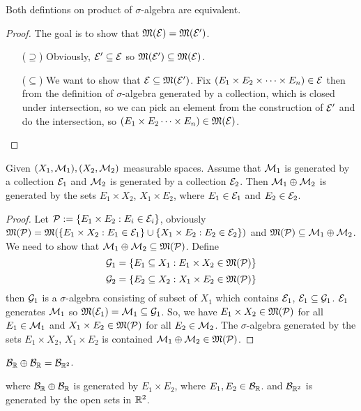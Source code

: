 \begin{claim}
  Both defintions on product of $\sigma$-algebra are equivalent. 
\end{claim}

\begin{proof}
  The goal is to show that $\mathfrak M(\mathcal E) = \mathfrak M(\mathcal E')$.
  \begin{itemize}
    \item[($\supseteq$)] Obviously, $\mathcal E' \subseteq \mathcal E$ so $\mathfrak M(\mathcal E') \subseteq \mathfrak M(\mathcal E)$.
    \item[($\subseteq$)] We want to show that $\mathcal E \subseteq \mathfrak M(\mathcal E')$. Fix $(E_1 \times E_2 \times \dotsm \times E_n) \in \mathcal E$ then 
    from the definition of $\sigma$-algebra generated by a collection, which is closed under intersection, so we can pick an element from the 
    construction of $\mathcal E'$ and do the intersection, so $(E_1 \times E_2 \dotsm \times E_n) \in \mathfrak M(\mathcal E)$.

  \end{itemize}
\end{proof}

\begin{theorem}
  Given $(X_1, \mathcal M_1), (X_2, \mathcal M_2)$ measurable spaces. Assume that  
  $\mathcal M_1$ is generated by a collection $\mathcal E_1$ and $\mathcal M_2$ is generated by a collection $\mathcal E_2$.
  Then $\mathcal M_1 \oplus \mathcal M_2$ is generated by the sets $E_1 \times X_2$, $X_1 \times E_2$, where $E_1 \in \mathcal E_1$ and $E_2 \in \mathcal E_2$.
\end{theorem}
\begin{proof}
  Let $\mathcal P := \{E_1 \times E_2 : E_i \in \mathcal E_i\}$, obviously $\mathfrak M(\mathcal P) = \mathfrak M(\{E_1\times X_2 : E_1 \in \mathcal E_1\}\cup\{X_1 \times E_2 : E_2 \in \mathcal E_2\})$ and $\mathfrak M(\mathcal P) \subseteq \mathcal M_1 \oplus \mathcal M_2$.
  We need to show that $\mathcal M_1 \oplus \mathcal M_2 \subseteq \mathfrak M(\mathcal P)$. Define 
  $$\mathcal G_1 = \{E_1 \subseteq X_1 : E_1 \times X_2 \in \mathfrak M(\mathcal P)\}$$
  $$\mathcal G_2 = \{E_2 \subseteq X_2 : X_1 \times E_2 \in \mathfrak M(\mathcal P)\}$$
  then $\mathcal G_1$ is a $\sigma$-algebra consisting of subset of $X_1$ which contains $\mathcal E_1$, $\mathcal E_1\subseteq \mathcal G_1$.
  $\mathcal E_1$ generates $\mathcal M_1$ so $\mathfrak M(\mathcal E_1) = \mathcal M_1 \subseteq \mathcal G_1$.
  So, we have $E_1 \times X_2 \in \mathfrak M(\mathcal P)$ for all $E_1 \in \mathcal M_1$ and $X_1 \times E_2 \in \mathfrak M(\mathcal P)$ for all $E_2 \in \mathcal M_2$.
  The $\sigma$-algebra generated by the sets $E_1 \times X_2$, $X_1 \times E_2$ is contained $\mathcal M_1 \oplus \mathcal M_2 \in \mathfrak M(\mathcal P)$.
\end{proof}

\begin{claim}
  $\mathcal B_\mathbb R \oplus \mathcal B_\mathbb R = \mathcal B_{\mathbb R^2}$.

  where $\mathcal B_\mathbb R \oplus \mathcal B_\mathbb R$ is generated by $E_1 \times E_2$, where $E_1, E_2 \in \mathcal B_\mathbb R$.
  and $\mathcal B_{\mathbb R^2}$ is generated by the open sets in $\mathbb R^2$. 
\end{claim}

